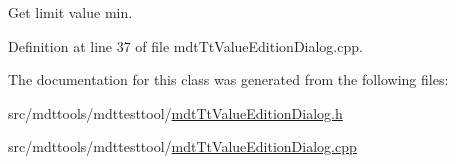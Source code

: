 Get limit value min. 



Definition at line 37 of file mdt\-Tt\-Value\-Edition\-Dialog.\-cpp.



The documentation for this class was generated from the following files\-:\begin{DoxyCompactItemize}
\item 
src/mdttools/mdttesttool/\hyperlink{mdt_tt_value_edition_dialog_8h}{mdt\-Tt\-Value\-Edition\-Dialog.\-h}\item 
src/mdttools/mdttesttool/\hyperlink{mdt_tt_value_edition_dialog_8cpp}{mdt\-Tt\-Value\-Edition\-Dialog.\-cpp}\end{DoxyCompactItemize}
